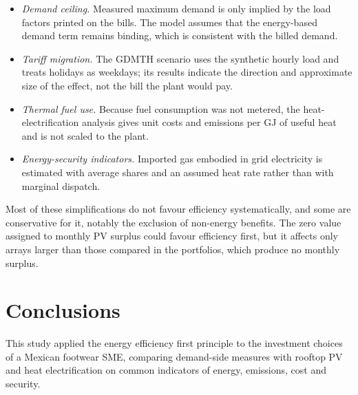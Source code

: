 \documentclass[preprint,12pt,authoryear]{elsarticle}
\begin{document}
\begin{itemize}
\item \emph{Demand ceiling.} Measured maximum demand is only implied by the load factors printed on the bills. The model assumes that the energy-based demand term remains binding, which is consistent with the billed demand.
\item \emph{Tariff migration.} The GDMTH scenario uses the synthetic hourly load and treats holidays as weekdays; its results indicate the direction and approximate size of the effect, not the bill the plant would pay.
\item \emph{Thermal fuel use.} Because fuel consumption was not metered, the heat-electrification analysis gives unit costs and emissions per GJ of useful heat and is not scaled to the plant.
\item \emph{Energy-security indicators.} Imported gas embodied in grid electricity is estimated with average shares and an assumed heat rate rather than with marginal dispatch.
\end{itemize}
Most of these simplifications do not favour efficiency systematically, and some are conservative for it, notably the exclusion of non-energy benefits. The zero value assigned to monthly PV surplus could favour efficiency first, but it affects only arrays larger than those compared in the portfolios, which produce no monthly surplus.

\section{Conclusions}
\label{sec:conclusions}

This study applied the energy efficiency first principle to the investment choices of a Mexican footwear SME, comparing demand-side measures with rooftop PV and heat electrification on common indicators of energy, emissions, cost and security.
\end{document}
